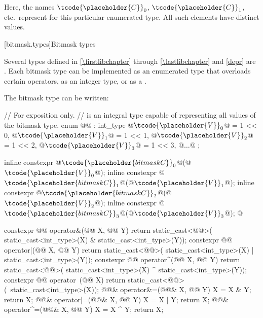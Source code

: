 \pnum
Here, the names $\tcode{\placeholder{C}}_0$,
$\tcode{\placeholder{C}}_1$, etc.\ represent
for this particular enumerated type.
%
All such elements have distinct values.

[bitmask.types]{Bitmask types}

\pnum
Several types defined in \ref{\firstlibchapter} through \ref{\lastlibchapter}
and \ref{depr} are
.
Each bitmask type can be implemented as an
enumerated type that overloads certain operators, as an integer type,
or as a
.
%

\pnum
The bitmask type  can be written:
\begin{codeblock}
// For exposition only.
//  is an integral type capable of representing all values of the bitmask type.
enum @@ : int_type {
  @$\tcode{\placeholder{V}}_{0}$@ = 1 << 0, @$\tcode{\placeholder{V}}_{1}$@ = 1 << 1, @$\tcode{\placeholder{V}}_{2}$@ = 1 << 2, @$\tcode{\placeholder{V}}_{3}$@ = 1 << 3, @$\ldots$@
};

inline constexpr @$\tcode{\placeholder{bitmask C}}_{0}$@(@$\tcode{\placeholder{V}}_{0}{}$@);
inline constexpr @$\tcode{\placeholder{bitmask C}}_{1}$@(@$\tcode{\placeholder{V}}_{1}{}$@);
inline constexpr @$\tcode{\placeholder{bitmask C}}_{2}$@(@$\tcode{\placeholder{V}}_{2}{}$@);
inline constexpr @$\tcode{\placeholder{bitmask C}}_{3}$@(@$\tcode{\placeholder{V}}_{3}{}$@);
  @\vdots@

constexpr @@ operator&(@@ X, @@ Y) {
  return static_cast<@@>(
    static_cast<int_type>(X) & static_cast<int_type>(Y));
}
constexpr @@ operator|(@@ X, @@ Y) {
  return static_cast<@@>(
    static_cast<int_type>(X) | static_cast<int_type>(Y));
}
constexpr @@ operator^(@@ X, @@ Y) {
  return static_cast<@@>(
    static_cast<int_type>(X) ^ static_cast<int_type>(Y));
}
constexpr @@ operator~(@@ X) {
  return static_cast<@@>(~static_cast<int_type>(X));
}
@@& operator&=(@@& X, @@ Y) {
  X = X & Y; return X;
}
@@& operator|=(@@& X, @@ Y) {
  X = X | Y; return X;
}
@@& operator^=(@@& X, @@ Y) {
  X = X ^ Y; return X;
}
\end{codeblock}

